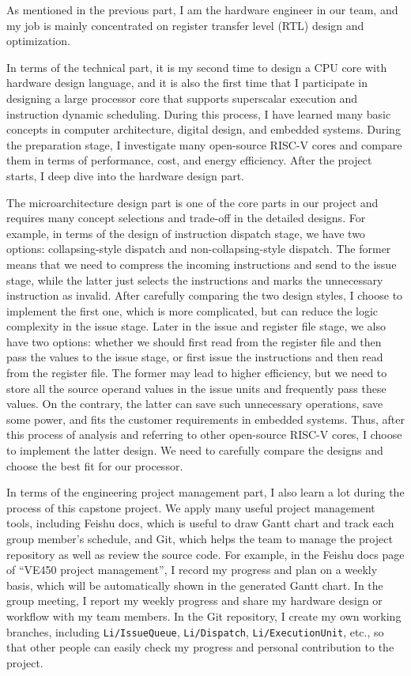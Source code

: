 As mentioned in the previous part, I am the hardware engineer in our team, and my job is mainly concentrated on register transfer level (RTL) design and optimization. 

In terms of the technical part, it is my second time to design a CPU core with hardware design language, and it is also the first time that I participate in designing a large processor core that supports superscalar execution and instruction dynamic scheduling. During this process, I have learned many basic concepts in computer architecture, digital design, and embedded systems. During the preparation stage, I investigate many open-source RISC-V cores and compare them in terms of performance, cost, and energy efficiency. After the project starts, I deep dive into the hardware design part. 

The microarchitecture design part is one of the core parts in our project and requires many concept selections and trade-off in the detailed designs. For example, in terms of the design of instruction dispatch stage, we have two options: collapsing-style dispatch and non-collapsing-style dispatch. The former means that we need to compress the incoming instructions and send to the issue stage, while the latter just selects the instructions and marks the unnecessary instruction as invalid. After carefully comparing the two design styles, I choose to implement the first one, which is more complicated, but can reduce the logic complexity in the issue stage. Later in the issue and register file stage, we also have two options: whether we should first read from the register file and then pass the values to the issue stage, or first issue the instructions and then read from the register file. The former may lead to higher efficiency, but we need to store all the source operand values in the issue units and frequently pass these values. On the contrary, the latter can save such unnecessary operations, save some power, and fits the customer requirements in embedded systems. Thus, after this process of analysis and referring to other open-source RISC-V cores, I choose to implement the latter design. We need to carefully compare the designs and choose the best fit for our processor.

In terms of the engineering project management part, I also learn a lot during the process of this capstone project. We apply many useful project management tools, including Feishu docs, which is useful to draw Gantt chart and track each group member’s schedule, and Git, which helps the team to manage the project repository as well as review the source code. For example, in the Feishu docs page of ``VE450 project management'', I record my progress and plan on a weekly basis, which will be automatically shown in the generated Gantt chart. In the group meeting, I report my weekly progress and share my hardware design or workflow with my team members. In the Git repository, I create my own working branches, including \texttt{Li/IssueQueue}, \texttt{Li/Dispatch}, \texttt{Li/ExecutionUnit}, etc., so that other people can easily check my progress and personal contribution to the project.

